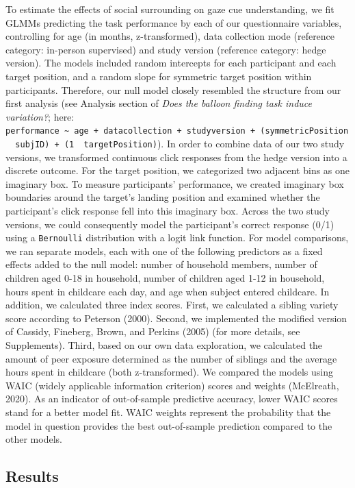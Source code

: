 \documentclass[
  man,floatsintext]{apa6}
\begin{document}
To estimate the effects of social surrounding on gaze cue understanding, we fit GLMMs predicting the task performance by each of our questionnaire variables, controlling for age (in months, z-transformed), data collection mode (reference category: in-person supervised) and study version (reference category: hedge version). The models included random intercepts for each participant and each target position, and a random slope for symmetric target position within participants. Therefore, our null model closely resembled the structure from our first analysis (see Analysis section of \emph{Does the balloon finding task induce variation?}; here: \texttt{performance\ \textasciitilde{}\ age\ +\ datacollection\ +\ studyversion\ +\ (symmetricPosition\ \textbar{}\ subjID)\ +\ (1\ \textbar{}\ targetPosition)}).
In order to combine data of our two study versions, we transformed continuous click responses from the hedge version into a discrete outcome. For the target position, we categorized two adjacent bins as one imaginary box. To measure participants' performance, we created imaginary box boundaries around the target's landing position and examined whether the participant's click response fell into this imaginary box. Across the two study versions, we could consequently model the participant's correct response (0/1) using a \texttt{Bernoulli} distribution with a logit link function.
For model comparisons, we ran separate models, each with one of the following predictors as a fixed effects added to the null model: number of household members, number of children aged 0-18 in household, number of children aged 1-12 in household, hours spent in childcare each day, and age when subject entered childcare.
In addition, we calculated three index scores. First, we calculated a sibling variety score according to Peterson (2000). Second, we implemented the modified version of Cassidy, Fineberg, Brown, and Perkins (2005) (for more details, see Supplements). Third, based on our own data exploration, we calculated the amount of peer exposure determined as the number of siblings and the average hours spent in childcare (both z-transformed).
We compared the models using WAIC (widely applicable information criterion) scores and weights (McElreath, 2020). As an indicator of out-of-sample predictive accuracy, lower WAIC scores stand for a better model fit. WAIC weights represent the probability that the model in question provides the best out-of-sample prediction compared to the other models.

\hypertarget{results-2}{%
\subsection{Results}\label{results-2}}
\end{document}
